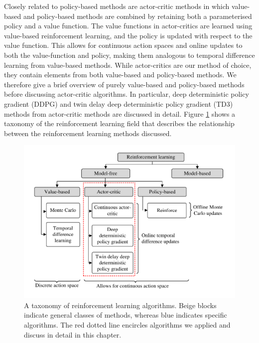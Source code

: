 Closely related to policy-based methods are actor-critic methods in which value-based and policy-based methods are combined by retaining both a parameterised policy and a value function. 
The value functions in actor-critics are learned using value-based reinforcement learning, and the policy is updated with respect to the value function.
This allows for continuous action spaces and online updates to both the value-function and policy, making them analogous to temporal difference learning from value-based methods.
While actor-critics are our method of choice, they contain elements from both value-based and policy-based methods.
We therefore give a brief overview of purely value-based and policy-based methods before discussing actor-critic algorithms.
In particular, deep deterministic policy gradient (DDPG) and twin delay deep deterministic policy gradient (TD3) methods from actor-critic methods are discussed in detail. 
Figure \ref{fig:reinforcement_learning_taxonomy} shows a taxonomy of the reinforcement learning field that describes the relationship between the reinforcement learning methods discussed.

\begin{figure}[!htb]
\centering
\includegraphics[width=\textwidth]{contents/chapt3/figs/reinforcement_learning_taxonomy.pdf}
\caption[A taxonomy of reinforcement learning algorithms]{A taxonomy of reinforcement learning algorithms. Beige blocks indicate general classes of methods, whereas blue indicates specific algorithms. The red dotted line encircles algorithms we applied and discuss in detail in this chapter.}
\label{fig:reinforcement_learning_taxonomy}
\end{figure}

